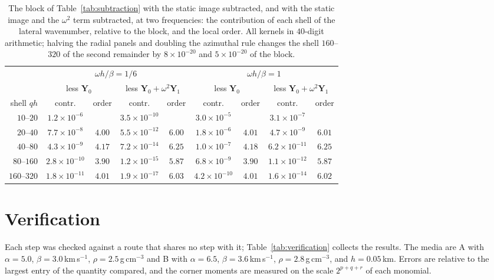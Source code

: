 \documentclass[11pt,a4paper]{article}
\begin{document}
\begin{table}[h]
\centering
\small
\begin{tabular}{rcccccccc}
\toprule
 & \multicolumn{4}{c}{$\omega h/\beta=1/6$} & \multicolumn{4}{c}{$\omega h/\beta=1$} \\
\cmidrule(lr){2-5}\cmidrule(l){6-9}
 & \multicolumn{2}{c}{less $\mathbf Y_0$} & \multicolumn{2}{c}{less $\mathbf Y_0+\omega^2\mathbf Y_1$}
 & \multicolumn{2}{c}{less $\mathbf Y_0$} & \multicolumn{2}{c}{less $\mathbf Y_0+\omega^2\mathbf Y_1$} \\
\cmidrule(lr){2-3}\cmidrule(lr){4-5}\cmidrule(lr){6-7}\cmidrule(l){8-9}
shell $qh$ & contr. & order & contr. & order & contr. & order & contr. & order \\
\midrule
$10$--$20$   & $1.2\times10^{-6}$  &        & $3.5\times10^{-10}$ &        & $3.0\times10^{-5}$  &        & $3.1\times10^{-7}$  &        \\
$20$--$40$   & $7.7\times10^{-8}$  & $4.00$ & $5.5\times10^{-12}$ & $6.00$ & $1.8\times10^{-6}$  & $4.01$ & $4.7\times10^{-9}$  & $6.01$ \\
$40$--$80$   & $4.3\times10^{-9}$  & $4.17$ & $7.2\times10^{-14}$ & $6.25$ & $1.0\times10^{-7}$  & $4.18$ & $6.2\times10^{-11}$ & $6.25$ \\
$80$--$160$  & $2.8\times10^{-10}$ & $3.90$ & $1.2\times10^{-15}$ & $5.87$ & $6.8\times10^{-9}$  & $3.90$ & $1.1\times10^{-12}$ & $5.87$ \\
$160$--$320$ & $1.8\times10^{-11}$ & $4.01$ & $1.9\times10^{-17}$ & $6.03$ & $4.2\times10^{-10}$ & $4.01$ & $1.6\times10^{-14}$ & $6.02$ \\
\bottomrule
\end{tabular}
\caption{The block of Table~\ref{tab:subtraction} with the static image subtracted, and with the static
image and the $\omega^2$ term subtracted, at two frequencies: the contribution of each shell of the lateral
wavenumber, relative to the block, and the local order. All kernels in $40$-digit arithmetic; halving the
radial panels and doubling the azimuthal rule changes the shell $160$--$320$ of the second remainder by
$8\times10^{-20}$ and $5\times10^{-20}$ of the block.}
\label{tab:omega2}
\end{table}

\section{Verification}\label{sec:verification}

Each step was checked against a route that shares no step with it; Table~\ref{tab:verification} collects the
results. The media are A with $\alpha=5.0$, $\beta=3.0$\,km\,s$^{-1}$, $\rho=2.5$\,g\,cm$^{-3}$ and B with
$\alpha=6.5$, $\beta=3.6$\,km\,s$^{-1}$, $\rho=2.8$\,g\,cm$^{-3}$, and $h=0.05$\,km. Errors are relative to
the largest entry of the quantity compared, and the corner moments are measured on the scale $2^{p+q+r}$ of
each monomial.
\end{document}
